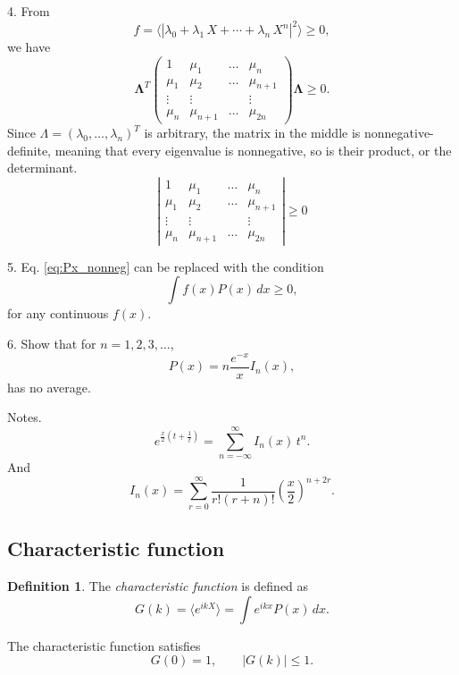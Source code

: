 \documentclass{book}
\numberwithin{equation}{section}
\theoremstyle{plain}
\theoremstyle{definition}
\newtheorem{defn}{Definition}[section]
\theoremstyle{remark}
\begin{document}
4. From
$$
f = \langle
|\lambda_0 + \lambda_1 \, X + \cdots + \lambda_n \, X^n|^2 \rangle \ge 0,
$$
we have
$$
\mathbf \Lambda^T
\left(
  \begin{array}{ccccc}
    1     & \mu_1 & \dots & \mu_n \\
    \mu_1 & \mu_2 & \dots & \mu_{n+1} \\
    \vdots& \vdots&       & \vdots \\
    \mu_n &\mu_{n+1}&\dots& \mu_{2n}
  \end{array}
\right)
\mathbf \Lambda
\ge 0.
$$
Since $\Lambda = (\lambda_0, \dots, \lambda_n)^T$ is arbitrary,
the matrix in the middle is nonnegative-definite,
meaning that every eigenvalue is nonnegative,
so is their product, or the determinant.
$$
\left|
  \begin{array}{ccccc}
    1     & \mu_1 & \dots & \mu_n \\
    \mu_1 & \mu_2 & \dots & \mu_{n+1} \\
    \vdots& \vdots&       & \vdots \\
    \mu_n &\mu_{n+1}&\dots& \mu_{2n}
  \end{array}
\right| \ge 0
$$


5. Eq. \eqref{eq:Px_nonneg} can be replaced with the condition
$$
\int f(x) P(x) \, dx \ge 0,
$$
for any continuous $f(x)$.


6. Show that for $n = 1, 2, 3, \dots$,
$$
P(x) = n \frac{e^{-x}}{x} I_n(x),
$$
has no average.

Notes.
$$
e^{ \frac{x}{2} \left( t + \frac{1}{t} \right) }
= \sum_{n = -\infty}^\infty I_n(x) \, t^n.
$$
And
$$
I_n(x) = \sum_{r = 0}^\infty \frac{1}{r! (r + n)!} \left(\frac x 2\right)^{n+2r}.
$$


\subsection*{Characteristic function}

\begin{defn}
The \emph{characteristic function} is defined as
\begin{equation}
G(k) = \langle e^{ikX} \rangle
=
\int e^{ikx} P(x) \, dx.
\end{equation}
\end{defn}

The characteristic function satisfies
\begin{equation}
  G(0) = 1, \qquad
  |G(k)| \le 1.
\end{equation}
\end{document}
